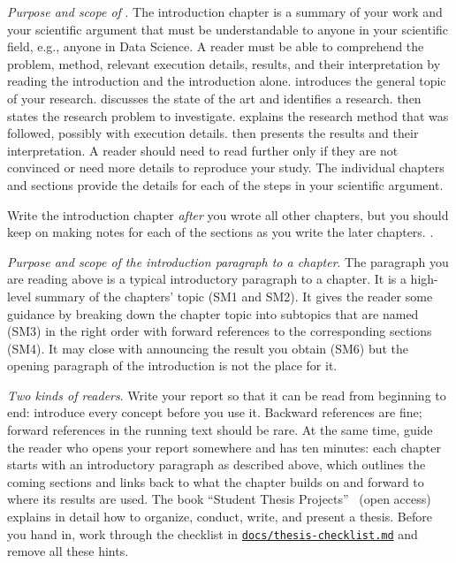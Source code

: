 \emph{Purpose and scope of }.
The introduction chapter is a summary of your work and your scientific argument that must be understandable to anyone in your scientific field, e.g., anyone in Data Science.
A reader must be able to comprehend the problem, method, relevant execution details, results, and their interpretation by reading the introduction and the introduction alone.
 introduces the general topic of your research.
 discusses the state of the art and identifies a research.
 then states the research problem to investigate.
 explains the research method that was followed, possibly with execution details.
 then presents the results and their interpretation.
A reader should need to read further only if they are not convinced or need more details to reproduce your study.
The individual chapters and sections provide the details for each of the steps in your scientific argument.

Write the introduction chapter \emph{after} you wrote all other chapters, but you should keep on making notes for each of the sections as you write the later chapters.
.

\emph{Purpose and scope of the introduction paragraph to a chapter}.
The paragraph you are reading above is a typical introductory paragraph to a chapter.
It is a high-level summary of the chapters' topic (SM1 and SM2).
It gives the reader some guidance by breaking down the chapter topic into subtopics that are named (SM3) in the right order with forward references to the corresponding sections (SM4).
It may close with announcing the result you obtain (SM6) but the opening paragraph of the introduction is not the place for it.

\emph{Two kinds of readers}.
Write your report so that it can be read from beginning to end: introduce every concept before you use it.
Backward references are fine; forward references in the running text should be rare.
At the same time, guide the reader who opens your report somewhere and has ten minutes:
each chapter starts with an introductory paragraph as described above, which outlines the coming sections and links back to what the chapter builds on and forward to where its results are used.
The book \enquote{Student Thesis Projects}~\cite{Lichter2026} (open access) explains in detail how to organize, conduct, write, and present a thesis.
Before you hand in, work through the checklist in \href{https://github.com/latextemplates/scientific-thesis-template/blob/main/docs/thesis-checklist.md}{\texttt{docs/thesis-checklist.md}} and remove all these hints.

